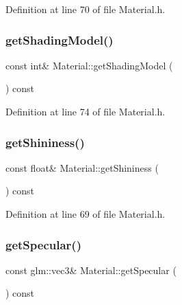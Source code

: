 Definition at line 70 of file Material.\+h.

\mbox{\label{class_material_a50ad1d1911490e2458f841b4e8195823}} 
\subsubsection{\texorpdfstring{get\+Shading\+Model()}{getShadingModel()}}
{\footnotesize\ttfamily const int\& Material\+::get\+Shading\+Model (\begin{DoxyParamCaption}{ }\end{DoxyParamCaption}) const\hspace{0.3cm}{\ttfamily [inline]}}



Definition at line 74 of file Material.\+h.

\mbox{\label{class_material_ae33424535bcfceb95632e09492d33972}} 
\subsubsection{\texorpdfstring{get\+Shininess()}{getShininess()}}
{\footnotesize\ttfamily const float\& Material\+::get\+Shininess (\begin{DoxyParamCaption}{ }\end{DoxyParamCaption}) const\hspace{0.3cm}{\ttfamily [inline]}}



Definition at line 69 of file Material.\+h.

\mbox{\label{class_material_a1781994da525d08bfb6d48187274d0a6}} 
\subsubsection{\texorpdfstring{get\+Specular()}{getSpecular()}}
{\footnotesize\ttfamily const glm\+::vec3\& Material\+::get\+Specular (\begin{DoxyParamCaption}{ }\end{DoxyParamCaption}) const\hspace{0.3cm}{\ttfamily [inline]}}



